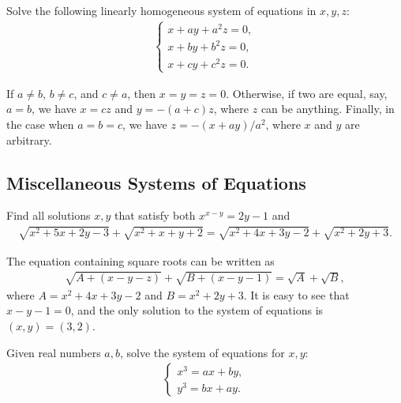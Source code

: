 \begin{question}
    Solve the following linearly homogeneous system of equations in $x,y,z$:
    \begin{align*}
        \begin{cases}
            x+ay+a^2z=0,\\x+by+b^2z=0,\\x+cy+c^2z=0.
        \end{cases}
    \end{align*}
\end{question}

\begin{solution}
    If $a\neq b$, $b\neq c$, and $c\neq a$, then $x=y=z=0$. Otherwise, if two are equal, say, $a=b$, we have $x=cz$ and $y=-(a+c)z$, where $z$ can be anything. Finally, in the case when $a=b=c$, we have $z=-(x+ay)/a^2$, where $x$ and $y$ are arbitrary.
\end{solution}


\subsection{Miscellaneous Systems of Equations}

\begin{question}
    Find all solutions $x,y$ that satisfy both $x^{x-y}=2y-1$ and
    \begin{align*}
        \sqrt{x^2+5x+2y-3}+\sqrt{x^2+x+y+2} = \sqrt{x^2+4x+3y-2}+\sqrt{x^2+2y+3}.
    \end{align*}
\end{question}

\begin{solution}
    The equation containing square roots can be written as
    \begin{align*}
        \sqrt{A+(x-y-z)} + \sqrt{B + (x-y-1)} = \sqrt{A} + \sqrt{B},
    \end{align*}
    where $A=x^2+4x+3y-2$ and $B=x^2+2y+3$. It is easy to see that $x-y-1=0$, and the only solution to the system of equations is $(x,y)=(3,2)$.
\end{solution}

\begin{question}
    Given real numbers $a,b$, solve the system of equations for $x,y$:
    \begin{align*}
        \begin{cases}
            x^3=ax+by,\\ y^3 = bx+ay.
        \end{cases}
    \end{align*}
\end{question}

